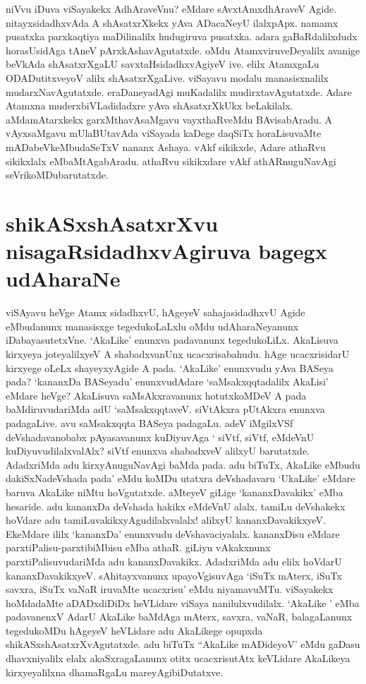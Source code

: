 niVvu  iDuva viSayakekx  AdhAraveVnu? eMdare  sAvxtAmxdhAraveV Agide.  nitayxsidadhxvAda A shAsatxrXkekx  yAva  ADacaNeyU ilalxpApx. namamx  pusatxka  parxkaqtiya maDilinalilx  hudugiruva pusatxka. adara gaBaRdalilxdudx  horasUsidAga tAneV  pArxkAshavAgutatxde. oMdu  AtamxviruveDeyalilx avanige beVkAda shAsatxrXgaLU savxtaHsidadhxvAgiyeV ive. elilx AtamxgaLu ODADutitxveyoV alilx shAsatxrXgaLive. viSayavu modalu manasisxnalilx  mudarxNavAgutatxde. eraDaneyadAgi muKadalilx  mudirxtavAgutatxde. Adare Atamxna muderxbiVLadidadxre yAva shAsatxrXkUkx  beLakilalx.  aMdamAtarxkekx  garxMthavAsaMgavu  vayxthaRveMdu  BAvisabAradu. A vAyxsaMgavu  mUlaBUtavAda viSayada kaDege daqSiTx horaLisuvaMte  mADabeVkeMbudaSeTxV nananx Ashaya. vAkf sikikxde, Adare athaRvu  sikikxlalx eMbaMtAgabAradu. athaRvu sikikxdare  vAkf athARnuguNavAgi seVrikoMDubarutatxde. 

\section*{shikASxshAsatxrXvu  nisagaRsidadhxvAgiruva bagegx  udAharaNe}

viSAyavu heVge Atamx sidadhxvU, hAgeyeV sahajasidadhxvU  Agide eMbudanunx  manasisxge tegedukoLaLxlu oMdu udAharaNeyanunx  iDabayasutetxVne. `AkaLike' enunxva padavanunx  tegedukoLiLx.  AkaLisuva kirxyeya joteyalilxyeV A shabadxvanUnx  ucacxrisabahudu. hAge ucacxrisidarU kirxyege oLeLx  shayeyxyAgide  A pada. `AkaLike' enunxvudu yAva BASeya pada? `kananxDa BASeyadu'  enunxvudAdare `saMsakxqqtadalilx  AkaLisi' eMdare heVge? AkaLisuva  saMsAkxravanunx  hotutxkoMDeV A pada baMdiruvudariMda adU `saMsakxqqtaveV. siVtAkxra pUtAkxra enunxva padagaLive. avu saMsakxqqta  BASeya padagaLu. adeV iMgilxVSf  deVshadavanobabx pAyasavanunx  kuDiyuvAga ` siVtf, siVtf, eMdeVnU kuDiyuvudilalxvalAlx? siVtf enunxva shabadxveV alilxyU barutatxde. AdadxriMda adu kirxyAnuguNavAgi baMda pada. adu biTuTx, AkaLike  eMbudu dakiSxNadeVshada pada' eMdu koMDu  utatxra deVshadavaru `UkaLike' eMdare baruva AkaLike  niMtu hoVgutatxde. aMteyeV giLige  `kananxDavakikx' eMba hesaride. adu kananxDa deVshada hakikx eMdeVnU alalx. tamiLu  deVshakekx hoVdare adu tamiLuvakikxyAgudilalxvalalx! alilxyU kananxDavakikxyeV. EkeMdare ililx  `kananxDa' enunxvudu deVshavaciyalalx. kananxDisu eMdare parxtiPalisu-parxtibiMbisu eMba athaR. giLiyu vAkakxnunx  parxtiPalisuvudariMda adu kananxDavakikx. AdadxriMda adu elilx hoVdarU kananxDavakikxyeV. sAhitayxvanunx upayoVgisuvAga `iSuTx mAterx,  iSuTx savxra, iSuTx  vaNaR iruvaMte ucacxrisu' eMdu niyamavuMTu. viSayakekx hoMdadaMte aDADxdiDiDx heVLidare viSaya nanilulxvudilalx.  `AkaLike ' eMba padavanenxV AdarU AkaLike  baMdAga mAterx, savxra, vaNaR, balagaLanunx  tegedukoMDu hAgeyeV heVLidare adu AkaLikege opupxda  shikASxshAsatxrXvAgutatxde. adu biTuTx  ``AkaLike  mADideyoV' eMdu  gaDasu dhavxniyalilx  elalx  akaSxragaLanunx  otitx  ucacxrisutAtx keVLidare  AkaLikeya kirxyeyalilxna  dhamaRgaLu mareyAgibiDutatxve. 

